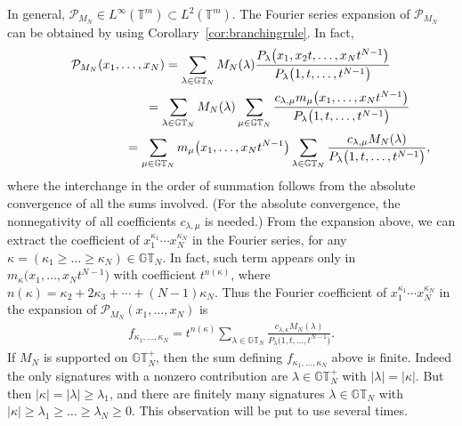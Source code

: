 \documentclass[pdftex]{sigma}
\numberwithin{equation}{section}
\newcommand{\GT}{\mathbb{GT}}
\newcommand{\GTp}{\mathbb{GT}^+}
\newcommand{\PPP}{\mathcal{P}}
\newcommand{\TT}{\mathbb{T}}
\begin{document}
In general, $\PPP_{M_N}\in L^{\infty}(\TT^m) \subset L^2(\TT^m)$. The Fourier series expansion of $\PPP_{M_N}$ can be obtained by using Corollary~\ref{cor:branchingrule}. In fact,
\begin{gather*}
\PPP_{M_N}(x_1, \dots, x_N) = \sum_{\lambda\in\GT_N}{M_N(\lambda)\frac{P_{\lambda}\big(x_1, x_2t, \dots, x_Nt^{N-1}\big)}{P_{\lambda}\big(1, t, \dots, t^{N-1}\big)}}\\
\hphantom{\PPP_{M_N}(x_1, \dots, x_N)}{} = \sum_{\lambda\in\GT_N}{M_N(\lambda) \sum_{\mu\in\GT_N}{\frac{c_{\lambda, \mu} m_{\mu}\big(x_1, \dots, x_N t^{N-1}\big)}{P_{\lambda}\big(1, t, \dots, t^{N-1}\big)}} }\\
\hphantom{\PPP_{M_N}(x_1, \dots, x_N)}{}= \sum_{\mu\in\GT_N}{ m_{\mu}\big(x_1, \dots, x_N t^{N-1}\big) \sum_{\lambda\in\GT_N}{\frac{c_{\lambda, \mu}M_N(\lambda)}{P_{\lambda}\big(1, t, \dots, t^{N-1}\big)}} },
\end{gather*}
where the interchange in the order of summation follows from the absolute convergence of all the sums involved. (For the absolute convergence, the nonnegativity of all coef\/f\/icients $c_{\lambda, \mu}$ is needed.)
From the expansion above, we can extract the coef\/f\/icient of $x_1^{\kappa_1}\cdots x_N^{\kappa_N}$ in the Fourier series, for any $\kappa = (\kappa_1 \geq \dots \geq \kappa_N)\in\GT_N$. In fact, such term appears only in $m_{\kappa}\big(x_1, \dots, x_Nt^{N-1}\big)$ with coef\/f\/icient $t^{n(\kappa)}$, where $n(\kappa) = \kappa_2 + 2\kappa_3 + \cdots + (N-1)\kappa_N$. Thus the Fourier coef\/f\/icient of $x_1^{\kappa_1}\cdots x_N^{\kappa_N}$ in the expansion of $\PPP_{M_N}(x_1, \dots, x_N)$ is
\begin{gather}\label{rem:fouriercoeffs}
f_{\kappa_1, \dots, \kappa_N} = t^{n(\kappa)} \sum_{\lambda\in\GT_N}{\frac{c_{\lambda, \kappa}M_N(\lambda)}{P_{\lambda}\big(1, t, \dots, t^{N-1}\big)}}.
\end{gather}
If $M_N$ is supported on $\GTp_N$, then the sum def\/ining $f_{\kappa_1, \dots, \kappa_N}$ above is f\/inite. Indeed the only signatures with a nonzero contribution are $\lambda\in\GTp_N$ with $|\lambda| = |\kappa|$. But then $|\kappa| = |\lambda| \geq \lambda_1$, and there are f\/initely many signatures $\lambda\in\GT_N$ with $|\kappa| \geq \lambda_1 \geq \dots \geq \lambda_N \geq 0$. This observation will be put to use several times.
\end{document}
